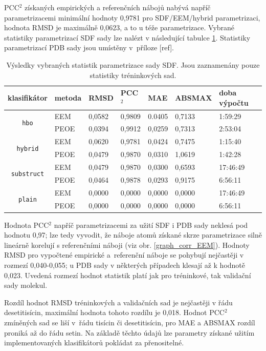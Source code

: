 PCC$^2$ získaných empirických a referenčních nábojů nabývá napříč parametrizacemi minimální hodnoty 0,9781 pro SDF/EEM/hybrid parametrizaci, hodnota RMSD je maximálně 0,0623, a to u téže parametrizace. Vybrané statistiky parametrizací SDF sady lze nalézt v následující tabulce \ref{statistics}. Statistiky parametrizací PDB sady jsou umístěny v~příloze [ref]. 
\medskip
\begin{table}[h]
    \renewcommand{\arraystretch}{1.4}
    \centering
    \begin{tabular}{c|l|l|l|l|l|l}
         \textbf{klasifikátor} &  \textbf{metoda} & \textbf{RMSD} & \textbf{PCC$^2$} & \textbf{MAE} & \textbf{ABSMAX} & \textbf{doba výpočtu}\\
         \hline
         \multirow{2}{6em}{\texttt{hbo}} & EEM & 0,0582 & 0,9809 & 0.0405 & 0,7133 & 1:59:29  \\
         & PEOE & 0,0394 & 0,9912 & 0,0259 & 0,7313 & 2:53:04 \\
         \hline
         \multirow{2}{6em}{\texttt{hybrid}} & EEM & 0,0620 & 0,9781 & 0,0424 & 0,7475 & 1:15:40 \\
         & PEOE & 0,0479 & 0,9870 & 0,0310 & 1,0619 & 1:42:28 \\
         \hline
         \multirow{2}{6em}{\texttt{substruct}} & EEM & 0,0479 & 0,9870 & 0,0300 & 0,6593 & 17:46:49 \\
         & PEOE & 0,0464 & 0,9878 & 0,0293 & 0,9175 & 6:56:11 \\
         \hline
         \multirow{2}{6em}{\texttt{plain}} & EEM & 0,0000 & 0,0000 & 0,0000 & 0,0000 & 17:46:49 \\
         & PEOE & 0,0000 & 0,0000 & 0,0000 & 0,0000 & 6:56:11
    \end{tabular}
    \caption{Výsledky vybraných statistik parametrizace sady SDF. Jsou zaznamenány pouze statistiky tréninkových sad.}
    \label{statistics}
\end{table}
\medskip

Hodnota PCC$^2$ napříč parametrizacemi za užití SDF i PDB sady neklesá pod hodnotu 0,97; lze tedy vyvodit, že náboje atomů získané skrze parametrizace silně lineárně korelují s referenčními náboji (viz obr. \ref{graph_corr_EEM}). Hodnoty RMSD pro vypočtené empirické a~referenční náboje se pohybují nejčastěji v rozmezí 0,040-0,055; u PDB sady v některých případech klesají až k hodnotě 0,023. Uvedená rozmezí hodnot statistik platí jak pro tréninkové, tak validační sady molekul. 

Rozdíl hodnot RMSD tréninkových a validačních sad je nejčastěji v řádu desetitisícin, maximální hodnota tohoto rozdílu je 0,018. Hodnot PCC$^2$ zmíněných sad se liší v~řádu tisícin či desetitisícin, pro MAE a ABSMAX rozdíl proniká až do řádu setin. Na základě těchto údajů lze  parametry získané užitím implementovaných klasifikátorů pokládat za přenositelné.

